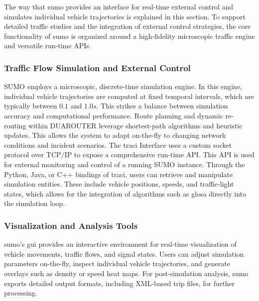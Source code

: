 The way that \ac{sumo} provides an interface for real-time external control and simulates individual vehicle trajectories is explained in this section. To support detailed traffic studies and the integration of external control strategies, the core functionality of \ac{sumo} is organized around a high-fidelity microscopic traffic engine and versatile run-time APIs. \cite{TraCIDocs2024, Krajzewicz2002}

\subsubsection{Traffic Flow Simulation and External Control}
\label{subsubsec:traffic_flow_control}

SUMO employs a microscopic, discrete-time simulation engine. In this engine, individual vehicle trajectories are computed at fixed temporal intervals, which are typically between $0.1$ and $1.0\unit{s}$. This strikes a balance between simulation accuracy and computational performance. \cite{Koutsopoulos2005Microsim, Krajzewicz2002} Route planning and dynamic re-routing within DUAROUTER leverage shortest-path algorithms and heuristic updates. This allows the system to adapt on-the-fly to changing network conditions and incident scenarios. \cite{SUMODocs2025}
\mynewline
The \ac{traci} Interface uses a custom socket protocol over TCP/IP to expose a comprehensive run-time API. This API is used for external monitoring and control of a running SUMO instance. Through the Python, Java, or C++ bindings of \ac{traci}, users can retrieve and manipulate simulation entities. These include vehicle positions, speeds, and traffic-light states, which allows for the integration of algorithms such as \ac{glosa} directly into the simulation loop. \cite{TraCIDocs2024, Krajzewicz2002}

\subsubsection{Visualization and Analysis Tools}
\label{subsubsec:visualization_analysis_tools}

\ac{sumo}’s \ac{gui} provides an interactive environment for real-time visualization of vehicle movements, traffic flows, and signal states. Users can adjust simulation parameters on-the-fly, inspect individual vehicle trajectories, and generate overlays such as density or speed heat maps. For post-simulation analysis, \ac{sumo} exports detailed output formats, including XML-based trip files, for further processing. \cite{Krajzewicz2002}

